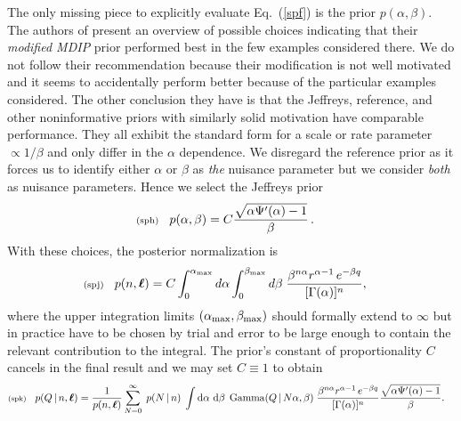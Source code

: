 \documentclass[11pt]{article}
\newcommand{\lleq}[1]{\label{#1} }
\renewcommand{\lleq}[1]{\label{#1} {\scriptstyle {\rm (#1)}} \hspace*{2ex} }
\newcommand{\cond}{\,|\,}
\newcommand{\refeq}[1]{Eq.~(\ref{#1})}
\DeclareMathOperator{\GammaDist}{Gamma}
\newcommand{\Kalpha}{{K_\alpha}}
\newcommand{\Kbeta}{{K_\beta}}
\newcommand{\rmdx}[1]{\dd{#1}} %
\begin{document}
The only missing piece to explicitly evaluate \refeq{spf} is the prior
$p(\alpha,\beta)$.
The authors of \cite{moala2013bayesian} present an overview of
possible choices indicating that their \emph{modified MDIP} prior
performed best in the few examples considered there. We do not follow
their recommendation because their modification is not well motivated
and it seems to accidentally perform better because of the particular
examples considered. The other conclusion they have is that the
Jeffreys, reference, and other noninformative priors with similarly
solid motivation have comparable performance. They all exhibit the
standard form for a scale or rate parameter $\propto 1/\beta$ and only
differ in the $\alpha$ dependence. We disregard the reference prior as
it forces us to identify either $\alpha$ or $\beta$ as \emph{the}
nuisance parameter but we consider \emph{both} as nuisance
parameters. Hence we select the Jeffreys prior
\begin{align}
  \lleq{sph}
  p(\alpha,\beta)
  &=  C \frac{\sqrt{\alpha \Psi'(\alpha)-1}}{\beta} \, .
\end{align}
With these choices, the posterior normalization is
\begin{align}
  \lleq{spj}
  p(n, \bml) &= C \int_0^{\alpha_{\rm max}} d\alpha \int_0^{\beta_{\rm max}} d\beta\;
  \frac{\beta^{n\alpha} r^{\alpha-1}\,e^{-\beta q}}{[\Gamma(\alpha)]^n},
\end{align}
where the upper integration limits
$(\alpha_{\rm max}, \beta_{\rm max})$ should formally extend to
$\infty$ but in practice have to be chosen by trial and error to be
large enough to contain the relevant contribution to the integral.
The prior's constant of proportionality $C$ cancels in the final
result and we may set $C\equiv 1$ to obtain
\begin{align}
  \lleq{spk}
  p(Q\cond n,\bml)
  &= \frac{1}{p(n, \bml)}
    \sum_{N=0}^\infty \;
    p(N\cond n)\;
    \int \rmdx{\alpha}\,\rmdx{\beta}\;
    \GammaDist(Q\cond N\alpha, \beta)\;
    \frac{\beta^{n\alpha} r^{\alpha-1}\,e^{-\beta q}}{[\Gamma(\alpha)]^n} \frac{\sqrt{\alpha \Psi'(\alpha)-1}}{\beta}.
\end{align}
\end{document}
